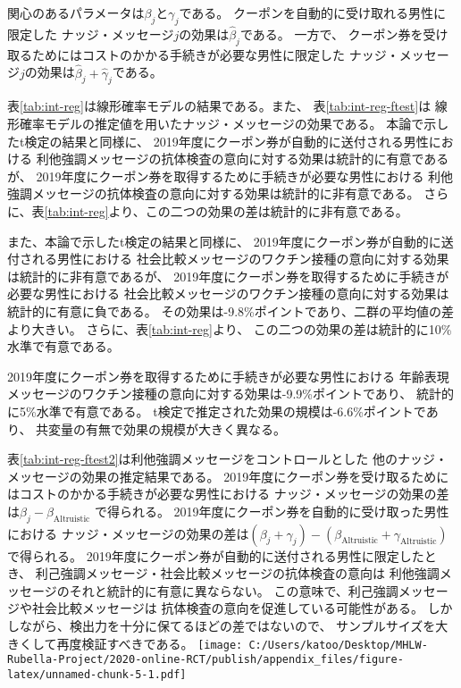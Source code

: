 \documentclass[
  11pt,
  a4paper,
]{article}
\begin{document}
関心のあるパラメータは\(\beta_j\)と\(\gamma_j\)である。
クーポンを自動的に受け取れる男性に限定した
ナッジ・メッセージ\(j\)の効果は\(\hat{\beta}_j\)である。
一方で、
クーポン券を受け取るためにはコストのかかる手続きが必要な男性に限定した
ナッジ・メッセージ\(j\)の効果は\(\hat{\beta}_j + \hat{\gamma}_j\)である。

表\ref{tab:int-reg}は線形確率モデルの結果である。また、
表\ref{tab:int-reg-ftest}は
線形確率モデルの推定値を用いたナッジ・メッセージの効果である。
本論で示したt検定の結果と同様に、
2019年度にクーポン券が自動的に送付される男性における
利他強調メッセージの抗体検査の意向に対する効果は統計的に有意であるが、
2019年度にクーポン券を取得するために手続きが必要な男性における
利他強調メッセージの抗体検査の意向に対する効果は統計的に非有意である。
さらに、表\ref{tab:int-reg}より、この二つの効果の差は統計的に非有意である。

また、本論で示したt検定の結果と同様に、
2019年度にクーポン券が自動的に送付される男性における
社会比較メッセージのワクチン接種の意向に対する効果は統計的に非有意であるが、
2019年度にクーポン券を取得するために手続きが必要な男性における
社会比較メッセージのワクチン接種の意向に対する効果は統計的に有意に負である。
その効果は-9.8\%ポイントであり、二群の平均値の差より大きい。
さらに、表\ref{tab:int-reg}より、
この二つの効果の差は統計的に10\%水準で有意である。

2019年度にクーポン券を取得するために手続きが必要な男性における
年齢表現メッセージのワクチン接種の意向に対する効果は-9.9\%ポイントであり、
統計的に5\%水準で有意である。
t検定で推定された効果の規模は-6.6\%ポイントであり、
共変量の有無で効果の規模が大きく異なる。

表\ref{tab:int-reg-ftest2}は利他強調メッセージをコントロールとした
他のナッジ・メッセージの効果の推定結果である。
2019年度にクーポン券を受け取るためにはコストのかかる手続きが必要な男性における
ナッジ・メッセージの効果の差は\(\beta_j - \beta_{\text{Altruistic}}\)
で得られる。
2019年度にクーポン券を自動的に受け取った男性における
ナッジ・メッセージの効果の差は\((\beta_j + \gamma_j) - (\beta_{\text{Altruistic}} + \gamma_{\text{Altruistic}})\)
で得られる。
2019年度にクーポン券が自動的に送付される男性に限定したとき、
利己強調メッセージ・社会比較メッセージの抗体検査の意向は
利他強調メッセージのそれと統計的に有意に異ならない。
この意味で、利己強調メッセージや社会比較メッセージは
抗体検査の意向を促進している可能性がある。
しかしながら、検出力を十分に保てるほどの差ではないので、
サンプルサイズを大きくして再度検証すべきである。
\texttt{[image: C:/Users/katoo/Desktop/MHLW-Rubella-Project/2020-online-RCT/publish/appendix\_files/figure-latex/unnamed-chunk-5-1.pdf]}
\end{document}
